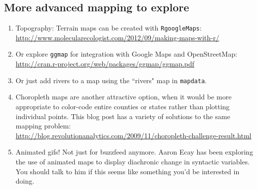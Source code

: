 \documentclass[12pt]{article}
\begin{document}
\subsection{More advanced mapping to explore}
\begin{enumerate}
\item Topography: Terrain maps can be created with \texttt{RgoogleMaps}:\\ \url{http://www.molecularecologist.com/2012/09/making-maps-with-r/}
\item Or explore \texttt{ggmap} for integration with Google Maps and OpenStreetMap:\\
\url{http://cran.r-project.org/web/packages/ggmap/ggmap.pdf}
\item Or just add rivers to a map using the ``rivers" map in \texttt{mapdata}.
\item Choropleth maps are another attractive option, when it would be more appropriate to color-code entire counties or states rather than plotting individual points. This blog post has a variety of solutions to the same mapping problem:\\
\url{http://blog.revolutionanalytics.com/2009/11/choropleth-challenge-result.html}
\item Animated gifs! Not just for buzzfeed anymore. Aaron Ecay has been exploring the use of animated maps to display diachronic change in syntactic variables. You should talk to him if this seems like something you'd be interested in doing.
\end{enumerate}
\end{document}

